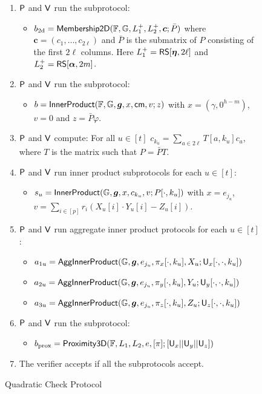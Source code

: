 \begin{figure}[h!]
\begin{framed}
\begin{itemize}
\begin{enumerate}[{\rm 1.}]
\item $\mathsf{P}$ and $\mathsf{V}$ run the subprotocol:
	\begin{itemize}
	\item $b_{\rm
2d}=\mathsf{Membership2D}(\mathbb{F},\mathbb{G},L^{+}_1,L^{+}_2,\bm{c};\bar{P})$ where
$\bm{c}=(c_1,\ldots,c_{2\ell})$ and $\bar{P}$ is the submatrix of $P$ consisting
of the first $2\ell$ columns. Here $L^{+}_1=\mathsf{RS}[\bm{\eta},2\ell]$ and
$L^{+}_2=\mathsf{RS}[\bm{\alpha},2m]$.
	\end{itemize}
\item $\mathsf{P}$ and $\mathsf{V}$ run the subprotocol:
	\begin{itemize}
	\item $b=\mathsf{InnerProduct}(\mathbb{F},\mathbb{G},\bm{g},x,\mathsf{cm},v;z)$
with $x=(\gamma,0^{h-m})$, $v=0$ and $z=\bar{P}\varphi$.
	\end{itemize}
\item $\mathsf{P}$ and $\mathsf{V}$ compute: For all $u\in [t]$ $c_{k_u} =
\sum_{a\in 2\ell}T[a,k_u]c_a$, where $T$ is the matrix such that $P=\bar{P}T$.
\item $\mathsf{P}$ and $\mathsf{V}$ run inner product subprotocols for each $u\in
[t]$:
	\begin{itemize}
	\item $s_u=\mathsf{InnerProduct}(\mathbb{G},\bm{g},x,c_{k_u},v;P[\cdot,k_u])$ with
$x=e_{j_u}$, $v=\sum_{i\in [p]}r_i(X_u[i]\cdot Y_u[i] - Z_u[i])$.
	\end{itemize}
\item $\mathsf{P}$ and $\mathsf{V}$ run aggregate inner product protocols for each
$u\in [t]$:
	\begin{itemize}
	\item
$a_{1u}=\mathsf{AggInnerProduct}(\mathbb{G},\bm{g},e_{j_u},\pi_x[\cdot,k_u],X_u;\mathsf{U}_x[\cdot,\cdot,k_u])$
	\item
$a_{2u}=\mathsf{AggInnerProduct}(\mathbb{G},\bm{g},e_{j_u},\pi_y[\cdot,k_u],Y_u;\mathsf{U}_y[\cdot,\cdot,k_u])$
	\item
$a_{3u}=\mathsf{AggInnerProduct}(\mathbb{G},\bm{g},e_{j_u},\pi_z[\cdot,k_u],Z_u;\mathsf{U}_z[\cdot,\cdot,k_u])$
	\end{itemize}
\item $\mathsf{P}$ and $\mathsf{V}$ run the subprotocol: 
	\begin{itemize}
	\item $b_{\rm prox} =
\mathsf{Proximity3D}(\mathbb{F},L_1,L_2,e,[\pi];[\mathsf{U}_x||\mathsf{U}_y||\mathsf{U}_z])$
	\end{itemize}
\item The verifier accepts if all the subprotocols accept.
\end{enumerate}
\end{itemize}
\end{framed}
\caption{Quadratic Check Protocol}
\label{fig:quadcheck}
\end{figure}

